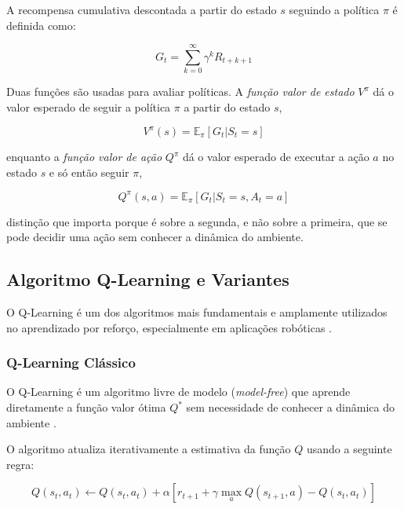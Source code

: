 A recompensa cumulativa descontada a partir do estado $s$ seguindo a política $\pi$ é definida como:

\begin{equation}
G_t = \sum_{k=0}^{\infty} \gamma^k R_{t+k+1}
\end{equation}

Duas funções são usadas para avaliar políticas. A \emph{função valor de estado}
$V^{\pi}$ dá o valor esperado de seguir a política $\pi$ a partir do estado $s$,

\begin{equation}
V^{\pi}(s) = \mathbb{E}_{\pi}[G_t | S_t = s]
\end{equation}

enquanto a \emph{função valor de ação} $Q^{\pi}$ dá o valor esperado de executar a ação
$a$ no estado $s$ e só então seguir $\pi$,

\begin{equation}
Q^{\pi}(s, a) = \mathbb{E}_{\pi}[G_t | S_t = s, A_t = a]
\end{equation}

distinção que importa porque é sobre a segunda, e não sobre a primeira, que se pode
decidir uma ação sem conhecer a dinâmica do ambiente.

\subsection{Algoritmo Q-Learning e Variantes}

O Q-Learning é um dos algoritmos mais fundamentais e amplamente utilizados no aprendizado por reforço, especialmente em aplicações robóticas \cite{Watkins1992}.

\subsubsection{Q-Learning Clássico}

O Q-Learning é um algoritmo livre de modelo (\textit{model-free}) que aprende diretamente a função valor ótima $Q^*$ sem necessidade de conhecer a dinâmica do ambiente \cite{Watkins1992}.

O algoritmo atualiza iterativamente a estimativa da função $Q$ usando a seguinte regra:

\begin{equation}
Q(s_t, a_t) \leftarrow Q(s_t, a_t) + \alpha [r_{t+1} + \gamma \max_{a} Q(s_{t+1}, a) - Q(s_t, a_t)]
\label{eq:fund-qlearning}
\end{equation}

